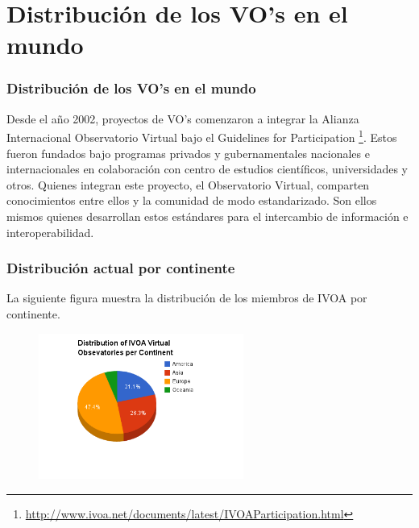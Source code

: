 \section{Distribución de los VO's en el mundo}


\begin{frame}
\frametitle{Distribución de los VO's en el mundo}

Desde el año 2002, proyectos de VO's comenzaron a integrar la Alianza
Internacional Observatorio Virtual bajo el Guidelines for Participation
\footnote{\url{http://www.ivoa.net/documents/latest/IVOAParticipation.html}}.
\newline
\newline
Estos fueron fundados bajo programas privados y gubernamentales nacionales e
internacionales en colaboración con centro de estudios científicos,
universidades y otros. Quienes integran este proyecto, el Observatorio Virtual,
comparten conocimientos entre ellos y la comunidad de modo estandarizado. Son
ellos mismos quienes desarrollan estos estándares para el intercambio de
información e interoperabilidad.

\end{frame}

\newpage

\begin{frame}
\frametitle{Distribución actual por continente}
La siguiente figura muestra la distribución de los miembros de IVOA por continente.

    \begin{figure}[h!t]
        \begin{center}
            \includegraphics[width=0.6\textwidth]{img/ivoa_vos_distribution.png}
        \end{center}
    \end{figure}
\end{frame}

